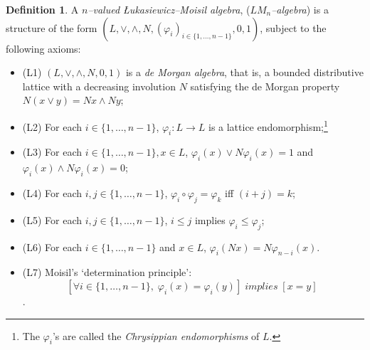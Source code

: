 \documentclass[12pt]{article}
\theoremstyle{plain}
\theoremstyle{definition}
\newtheorem{definition}{Definition}[section]
\renewcommand{\phi}{\varphi}
\renewcommand{\phi}{\varphi}
\newcommand{\phii}{\phi_{i}}
\newcommand{\orc}{\forall}
\newcommand{\lra}{{\longrightarrow}}
\def\leq{\leqslant}
\begin{document}
\begin{definition}\rm

A {\it $n$--valued \L ukasiewicz--Moisil algebra}, ({\it $LM_{n}$--algebra}) is a structure of the form
$(L,\vee,\wedge,N,(\phii)_{i\in\{1,\ldots,n-1\}},0,1)$, subject to the following axioms:
\begin{itemize}
\item (L1) $(L,\vee,\wedge,N,0,1)$ is a {\it de Morgan algebra}, that is, a bounded distributive lattice with a decreasing involution $N$ satisfying the de Morgan property $N({x\vee y})=Nx\wedge Ny$;
\item (L2) For each $i\in\{1,\ldots,n-1\}$, $\phii:L\lra L$ is a lattice endomorphism;\footnote{The $\phii$'s are called the {\em Chrysippian endomorphisms} of $L$.}
\item (L3) For each $i\in\{1,\ldots,n-1\},x\in L$, $\phii(x)\vee N{\phii(x)}=1$ and
$\phii(x)\wedge N{\phii(x)}=0$;
\item (L4) For each $i,j\in\{1,\ldots,n-1\}$, $\phii\circ\phi_{j}=\phi_{k}$ iff $(i+j)= k$;
\item (L5) For each $i,j\in\{1,\ldots,n-1\}$, $i\leq j$ implies $\phii\leq\phi_{j}$;
\item (L6) For each $i\in\{1,\ldots,n-1\}$ and $x\in L$, $\phii(N x)=N\phi_{n-i}(x)$.
\item (L7) Moisil's `determination principle':
$$\left[\orc i\in\{1,\ldots,n-1\},\;\phii(x)=\phii(y)\right] \; implies \; [x = y] \;$$
\cite{GG-CV70,GG2k6}.
\end{itemize}
\end{definition}
\end{document}
